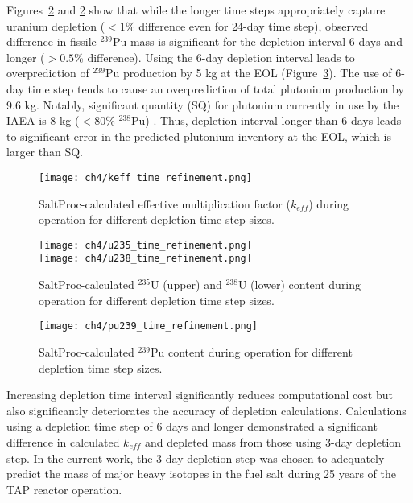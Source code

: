Figures~\ref{fig:timeref-u} and \ref{fig:timeref-u} show that while the longer 
time steps appropriately capture uranium depletion ($<1$\% difference even for 
24-day time step), observed difference in fissile $^{239}$Pu mass is 
significant for the depletion interval 6-days and longer ($>0.5$\% difference). 
Using the 6-day depletion interval leads to overprediction of $^{239}$Pu 
production by 5 kg at the \gls{EOL} (Figure~\ref{fig:timeref-pu239}). The use 
of 6-day time step tends to cause an overprediction of total plutonium 
production by 9.6 kg. Notably, significant quantity (SQ) for plutonium 
currently in use by the IAEA is 8 kg ($<80$\% $^{238}$Pu) 
\cite{close_iaea_1995}. Thus, depletion interval longer than 6 days leads to 
significant error in the predicted plutonium inventory at the \gls{EOL}, which 
is larger than SQ. 
\begin{figure}[hbp!] %
	\centering
	\texttt{[image: ch4/keff\_time\_refinement.png]}
	\caption{SaltProc-calculated effective multiplication factor ($k_{eff}$) 
	during operation for different depletion time step sizes.}
	\label{fig:timeref-keff}
\end{figure}

\begin{figure}[hbp!] %
	\centering
	\texttt{[image: ch4/u235\_time\_refinement.png]}\\
		\vspace{-11mm}
	\hspace{0.5mm}
	\texttt{[image: ch4/u238\_time\_refinement.png]}
		\vspace{-6mm}
	\caption{SaltProc-calculated $^{235}$U (upper) and $^{238}$U (lower) 
	content during operation for different depletion time step sizes.}
	\label{fig:timeref-u}
\end{figure}

\begin{figure}[htp!] %
	\centering
	\texttt{[image: ch4/pu239\_time\_refinement.png]}
	\caption{SaltProc-calculated $^{239}$Pu content during operation for 
		different depletion time step sizes.}
	\label{fig:timeref-pu239}
\end{figure}
Increasing depletion time interval significantly reduces computational cost but 
also significantly deteriorates the accuracy of depletion 
calculations. Calculations using a depletion time step of 6 days and longer 
demonstrated a significant difference in calculated $k_{eff}$ and depleted mass 
from those using 3-day depletion step. In the current work, the 3-day 
depletion step was chosen to adequately predict the mass of major heavy 
isotopes in the fuel salt during 25 years of the \gls{TAP} reactor operation.


